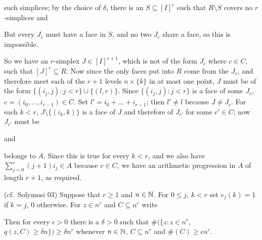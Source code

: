 {\noindent such simplices; by the choice of $\delta$, there is an
$S\subseteq[I]^r$ such that $R\setminus S$ covers no $r$-simplices and


\noindent
But every $J_c$ must have a face in $S$, and no two $J_c$ share a face, so
this is impossible.\ \Bang

So we have an $r$-simplex $J\in[I]^{r+1}$, which is not of the form $J_c$
where $c\in C$, such that $[J]^r\subseteq R$.   Now since the only faces
put into $R$ come from the $J_c$, and therefore meet each of the $r+1$
levels $n\times\{k\}$ in at most one point, $J$ must be of the form
$\{(i_j,j):j<r\}\cup\{(l,r)\}$.   Since $\{(i_j,j):j<r\}$ is a face of some
$J_c$, $c=(i_0,\ldots,i_{r-1})\in C$.   Set $l'=i_0+\ldots+i_{r-1}$;  then
$l'\ne l$ because $J\ne J_c$.   For each $k<r$,
$J\setminus\{(i_k,k)\}$ is a face of $J$ and therefore of $J_{c'}$ for some
$c'\in C$;  now $J_{c'}$ must be


\noindent and


\noindent belongs to $A$.   Since this is true for every $k<r$,
and we also have $\sum_{j=0}^r(j+1)i_j\in A$ because $c\in C$,
we have an arithmetic progression in $A$ of length $r+1$, as required.
}%

 (cf.\ {\smc Solymosi 03})
Suppose that $r\ge 1$ and $n\in\Bbb N$.   For $0\le j$,
$k<r$ set $e_j(k)=1$ if $k=j$, $0$ otherwise.   For
$z\in n^r$ and $C\subseteq n^r$ write


\noindent Then for every $\epsilon>0$ there is a $\delta>0$ such that
$\#(\{z:z\in n^r$, $q(z,C)\ge\delta n\})\ge\delta n^r$
whenever $n\in\Bbb N$, $C\subseteq n^r$ and $\#(C)\ge\epsilon n^r$.

